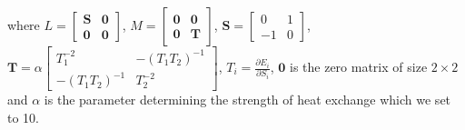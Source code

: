 \documentclass[openacc]{rsproca_new}%
\newcommand{\z}{\bm{z}}
\begin{document}
where 
$L = \begin{bmatrix}
\bm{S} & \bm{0} \\ \bm{0} & \bm{0}
\end{bmatrix}
$,
$
M = \begin{bmatrix}
\bm{0} & \bm{0} \\ \bm{0} & \bm{T}
\end{bmatrix}
$, 
$\bm{S} = \begin{bmatrix}
0 & 1 \\ -1 & 0
\end{bmatrix}
$, 
$\bm{T} =  \alpha \begin{bmatrix}
T_1^{-2} & -(T_1T_2)^{-1} \\ -(T_1T_{2})^{-1} & T_2^{-2}
\end{bmatrix}$, 
$T_i = \frac{\partial E_i}{\partial S_i}$, 
$\bm{0}$ is the zero matrix of size $2\times 2$
and 
$\alpha$ is the parameter determining the strength of heat exchange which we set to 10.
\end{document}

